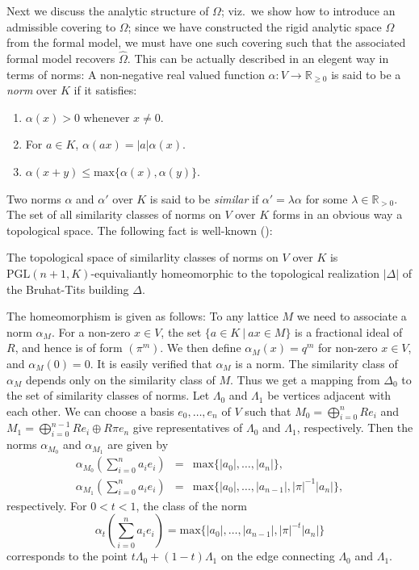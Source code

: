 Next we discuss the analytic structure of $\Omega$; viz.\ we show how
to introduce an admissible covering to $\Omega$; since we have
constructed the rigid analytic space $\Omega$ from the formal model, we 
must have one such covering such that the associated formal model 
recovers $\widehat{\Omega}$.
This can be actually described in an elegent way in terms of norms: 
A non-negative real valued function $\alpha\colon V\rightarrow
\mathbb{R}_{\geq 0}$ is said to be a {\it norm} over $K$ if it
satisfies:
\begin{enumerate}
\item $\alpha(x)>0$ whenever $x\neq 0$.
\item For $a\in K$, $\alpha(ax)=|a|\alpha(x)$.
\item $\alpha(x+y)\leq\mathrm{max}\{\alpha(x),\alpha(y)\}$.
\end{enumerate}
Two norms $\alpha$ and $\alpha'$ over $K$ is said to be {\it similar} if 
$\alpha'=\lambda\alpha$ for some $\lambda\in\mathbb{R}_{>0}$.
The set of all similarity classes of norms on $V$ over $K$ forms in an
obvious way a topological space. 
The following fact is well-known (\cite{tsopn}):

\begin{apppro}
The topological space of similarlity classes of norms on $V$ over $K$ is
$\mathrm{PGL}(n+1,K)$-equivaliantly homeomorphic to the topological 
realization $|\Delta|$ of the Bruhat-Tits building $\Delta$.
\end{apppro}

The homeomorphism is given as follows: To any lattice $M$ we need to 
associate a norm $\alpha_M$.
For a non-zero $x\in V$, the set $\{a\in K\ |\ ax\in M\}$ is a
fractional ideal of $R$, and hence is of form $(\pi^m)$.
We then define $\alpha_M(x)=q^m$ for non-zero $x\in V$, and
$\alpha_M(0)=0$.
It is easily verified that $\alpha_M$ is a norm.
The similarity class of $\alpha_M$ depends only on the similarity class
of $M$.
Thus we get a mapping from $\Delta_0$ to the set of similarity classes
of norms.
Let $\Lambda_0$ and $\Lambda_1$ be vertices adjacent with each other.
We can choose a basis $e_0,\ldots,e_n$ of $V$ such that 
$M_0=\bigoplus^n_{i=0}Re_i$ and $M_1=\bigoplus^{n-1}_{i=0}Re_i\oplus
R\pi e_n$ give representatives of $\Lambda_0$ and $\Lambda_1$,
respectively.
Then the norms $\alpha_{M_0}$ and $\alpha_{M_1}$ are given by
\begin{eqnarray*}
\alpha_{M_0}(\sum^n_{i=0}a_ie_i)&=&\mathrm{max}\{|a_0|,\ldots,|a_n|\},\\
\alpha_{M_1}(\sum^n_{i=0}a_ie_i)&=&\mathrm{max}\{|a_0|,\ldots,|a_{n-1}|,
|\pi|^{-1}|a_n|\},
\end{eqnarray*}
respectively.
For $0<t<1$, the class of the norm
$$
\alpha_t(\sum^n_{i=0}a_ie_i)=\mathrm{max}\{|a_0|,\ldots,|a_{n-1}|,
|\pi|^{-t}|a_n|\}
$$
corresponds to the point $t\Lambda_0+(1-t)\Lambda_1$ on the edge
connecting $\Lambda_0$ and $\Lambda_1$.

